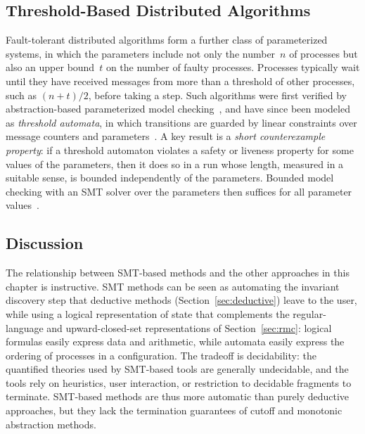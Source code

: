 \subsection{Threshold-Based Distributed Algorithms}

Fault-tolerant distributed algorithms form a further class of parameterized
systems, in which the parameters include not only the number~$n$ of processes
but also an upper bound~$t$ on the number of faulty processes. Processes
typically wait until they have received messages from more than a threshold
of other processes, such as $(n+t)/2$, before taking a step. Such algorithms were first
verified by abstraction-based parameterized model checking~\cite{JKSVW13},
and have since been modeled as \emph{threshold automata}, in which
transitions are guarded by linear constraints over message counters and
parameters~\cite{KVW17}. A key result is a \emph{short counterexample
property}: if a threshold automaton violates a safety or liveness property for
some values of the parameters, then it does so in a run whose length, measured
in a suitable sense, is bounded independently of the parameters. Bounded model
checking with an SMT solver over the parameters then suffices for all
parameter values~\cite{KVW17,KLVW17}.

\subsection{Discussion}

The relationship between SMT-based methods and the other approaches in this
chapter is instructive. SMT methods can be seen as automating the invariant
discovery step that deductive methods (Section~\ref{sec:deductive}) leave to
the user, while using a logical representation of state that complements the
regular-language and upward-closed-set representations of
Section~\ref{sec:rmc}: logical formulas easily
express data and arithmetic, while automata easily express the ordering of
processes in a configuration. The tradeoff is decidability: the quantified
theories used by SMT-based tools are generally undecidable, and the tools rely
on heuristics, user interaction, or restriction to decidable fragments to
terminate. SMT-based methods are thus more automatic than purely deductive
approaches, but they lack the termination guarantees of cutoff and monotonic
abstraction methods.
